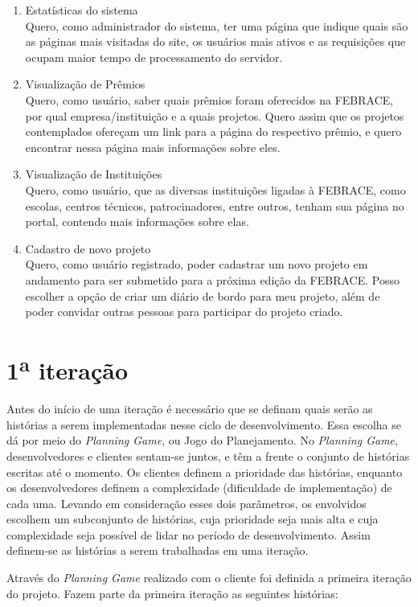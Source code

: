 \documentclass[a4paper,12pt,font=plain,header=plain]{abnt}
\begin{document}
\begin{enumerate}
	 \item Estatísticas do sistema \\
		Quero, como administrador do sistema, ter uma página que indique quais são as páginas mais visitadas do site, os usuários mais ativos e as requisições que ocupam maior tempo de processamento do servidor.
	 \item Visualização de Prêmios \\
		Quero, como usuário, saber quais prêmios foram oferecidos na FEBRACE, por qual empresa/instituição e a quais projetos. Quero assim que os projetos contemplados ofereçam um link para a página do respectivo prêmio, e quero encontrar nessa página mais informações sobre eles.
	 \item Visualização de Instituições \\
		Quero, como usuário, que as diversas instituições ligadas à FEBRACE, como escolas, centros técnicos, patrocinadores, entre outros, tenham sua página no portal, contendo mais informações sobre elas.
	 \item Cadastro de novo projeto \\
		Quero, como usuário registrado, poder cadastrar um novo projeto em andamento para ser submetido para a próxima edição da FEBRACE. Posso escolher a opção de criar um diário de bordo para meu projeto, além de poder convidar outras pessoas para participar do projeto criado.
	\end{enumerate}

  \section{1\textsuperscript{a} iteração}
    Antes do início de uma iteração é necessário que se definam quais serão as histórias a serem implementadas nesse ciclo de desenvolvimento. Essa escolha se dá por meio do \textit{Planning Game}, ou Jogo do Planejamento. No \textit{Planning Game}, desenvolvedores e clientes sentam-se juntos, e têm a frente o conjunto de histórias escritas até o momento. Os clientes definem a prioridade das histórias, enquanto os desenvolvedores definem a complexidade (dificuldade de implementação) de cada uma. Levando em consideração esses dois parâmetros, os envolvidos escolhem um subconjunto de histórias, cuja prioridade seja mais alta e cuja complexidade seja possível de lidar no período de desenvolvimento. Assim definem-se as histórias a serem trabalhadas em uma iteração.

    Através do \textit{Planning Game} realizado com o cliente foi definida a primeira iteração do projeto. Fazem parte da primeira iteração as seguintes histórias:
\end{document}
